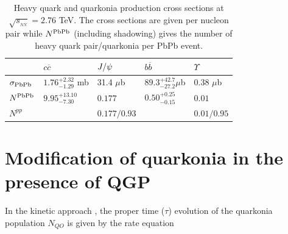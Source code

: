 \documentclass[aps,prc,preprint,superscriptaddress,showpacs,showkeys]{revtex4-1}
\begin{document}
\begin{table}
\caption[]{Heavy quark and quarkonia production  cross sections at
$\sqrt{s_{_{NN}}}= 2.76$ TeV. The cross sections are given per nucleon pair while
$N^{\rm PbPb}$ (including shadowing) gives the number of heavy quark pair/quarkonia per PbPb event.}
\label{NLOcros}
\begin{tabular}{l|l|l|l|l} 
\hline 
\hline
             & $ c \overline c$       &$J/\psi$       & $ b \overline b$        & $\Upsilon$   \\              
\hline
$\sigma_{\rm PbPb}$ & $1.76^{+2.32}_{-1.29}$ mb  & 31.4 $\mu$b   & $89.3^{+42.7}_{-27.2} \mu$b  & 0.38 $\mu$b  \\
$N^{\rm PbPb}$     & $9.95^{+13.10}_{-7.30}$     & $0.177$       & $0.50^{+0.25}_{-0.15}$       & $0.01$       \\
$N^{pp}$          &                         & $0.177/0.93$  &                        & $0.01/0.95$   \\
\hline
\hline
\end{tabular}
\end{table}





\section{Modification of quarkonia in the presence of QGP}
 In the kinetic approach \cite{Thews:2000rj}, the proper time ($\tau$) evolution of the quarkonia 
population $N_{QO}$
is given by the rate equation 
\end{document}
